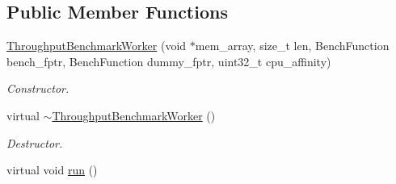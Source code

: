 \subsection*{Public Member Functions}
\begin{DoxyCompactItemize}
\item 
\hyperlink{classxmem_1_1benchmark_1_1_throughput_benchmark_worker_a271c77940bc7cb45fcc395d3ed14361c}{Throughput\+Benchmark\+Worker} (void $\ast$mem\+\_\+array, size\+\_\+t len, Bench\+Function bench\+\_\+fptr, Bench\+Function dummy\+\_\+fptr, uint32\+\_\+t cpu\+\_\+affinity)
\begin{DoxyCompactList}\small\item\em Constructor. \end{DoxyCompactList}\item 
\hypertarget{classxmem_1_1benchmark_1_1_throughput_benchmark_worker_a021aae8513f5da78e04ba711e308b705}{}virtual \hyperlink{classxmem_1_1benchmark_1_1_throughput_benchmark_worker_a021aae8513f5da78e04ba711e308b705}{$\sim$\+Throughput\+Benchmark\+Worker} ()\label{classxmem_1_1benchmark_1_1_throughput_benchmark_worker_a021aae8513f5da78e04ba711e308b705}

\begin{DoxyCompactList}\small\item\em Destructor. \end{DoxyCompactList}\item 
\hypertarget{classxmem_1_1benchmark_1_1_throughput_benchmark_worker_afb71dd763f55504ddabcabb24e0d6834}{}virtual void \hyperlink{classxmem_1_1benchmark_1_1_throughput_benchmark_worker_afb71dd763f55504ddabcabb24e0d6834}{run} ()\label{classxmem_1_1benchmark_1_1_throughput_benchmark_worker_afb71dd763f55504ddabcabb24e0d6834}


\end{DoxyCompactItemize}
